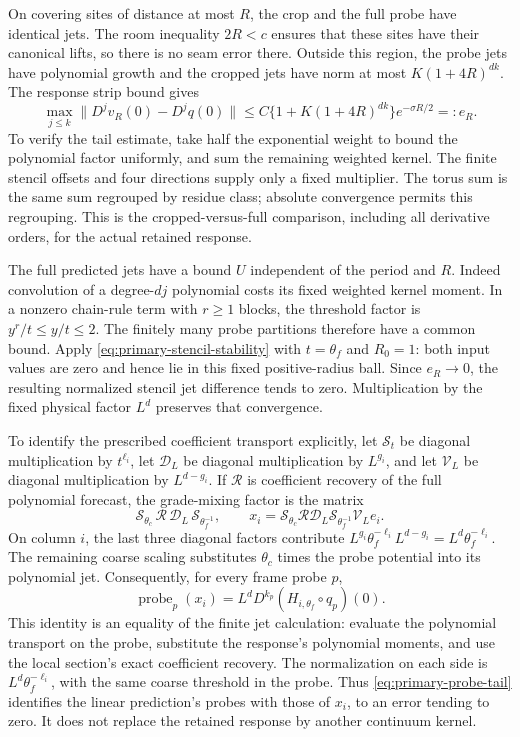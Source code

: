 On covering sites of distance at most $R$, the crop and the full
probe have identical jets. The room inequality $2R<c$ ensures that
these sites have their canonical lifts, so there is no seam error
there. Outside this region, the probe jets have polynomial growth
and the cropped jets have norm at most $K(1+4R)^{dk}$.
The response strip bound gives
\begin{equation}\label{eq:primary-probe-tail}
 \max_{j\le k}\|D^jv_R(0)-D^jq(0)\|
       \le C\{1+K(1+4R)^{dk}\}e^{-\sigma R/2}=:e_R.
\end{equation}
To verify the tail estimate, take half the exponential weight to
bound the polynomial factor uniformly, and sum the remaining
weighted kernel. The finite stencil offsets and four directions
supply only a fixed multiplier. The torus sum is the same sum
regrouped by residue class; absolute convergence permits this
regrouping. This is the cropped-versus-full comparison, including
all derivative orders, for the actual retained response.

The full predicted jets have a bound $U$ independent of the period
and $R$. Indeed convolution of a degree-$dj$ polynomial costs its
fixed weighted kernel moment. In a nonzero chain-rule term with
$r\ge1$ blocks, the threshold factor is $y^r/t\le y/t\le2$.
The finitely many probe partitions therefore have a common bound.
Apply \eqref{eq:primary-stencil-stability} with $t=\theta_f$ and
$R_0=1$: both input values are zero and hence lie in this fixed
positive-radius ball. Since $e_R\to0$, the resulting
normalized stencil jet difference tends to zero. Multiplication by
the fixed physical factor $L^d$ preserves that convergence.

To identify the prescribed coefficient transport explicitly, let
$\mathscr S_t$ be diagonal multiplication by $t^{\ell_i}$, let
$\mathscr D_L$ be diagonal multiplication by $L^{g_i}$, and let
$\mathscr V_L$ be diagonal multiplication by $L^{d-g_i}$. If
$\mathscr R$ is coefficient recovery of the full polynomial forecast,
the grade-mixing factor is the matrix
\[
 \mathscr S_{\theta_c}\,\mathscr R\,
             \mathscr D_L\,\mathscr S_{\theta_f^{-1}},
 \qquad
 x_i=\mathscr S_{\theta_c}\mathscr R
       \mathscr D_L\mathscr S_{\theta_f^{-1}}\mathscr V_L e_i.
\]
On column $i$, the last three diagonal factors contribute
$L^{g_i}\theta_f^{-\ell_i}L^{d-g_i}
 =L^d\theta_f^{-\ell_i}$. The remaining coarse scaling substitutes
$\theta_c$ times the probe potential into its polynomial jet.
Consequently, for every frame probe $p$,
\[
 \operatorname{probe}_p(x_i)
           =L^d D^{k_p}(H_{i,\theta_f}\circ q_p)(0).
\]
This identity is an equality of the finite jet calculation: evaluate
the polynomial transport on the probe, substitute the response's
polynomial moments, and use the local section's exact coefficient
recovery. The normalization on each side is
$L^d\theta_f^{-\ell_i}$, with the same coarse threshold in the
probe. Thus \eqref{eq:primary-probe-tail} identifies the linear
prediction's probes with those of $x_i$, to an error tending to zero.
It does not replace the retained response by another continuum kernel.

